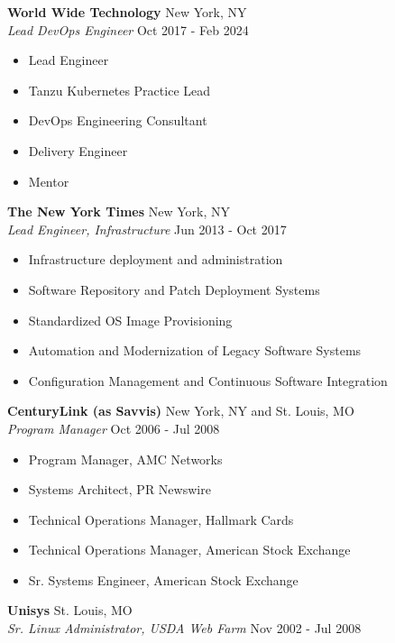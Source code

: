 \documentclass[letterpaper]{article}
\begin{document}
\textbf{World Wide Technology} \hfill New York, NY\\
\textit{Lead DevOps Engineer} \hfill Oct 2017 - Feb 2024\\
\vspace{-1mm}
\begin{itemize} \itemsep 1pt
	\item Lead Engineer
	\item Tanzu Kubernetes Practice Lead
	\item DevOps Engineering Consultant
	\item Delivery Engineer
	\item Mentor
\end{itemize}
\textbf{The New York Times} \hfill New York, NY\\
\textit{Lead Engineer, Infrastructure} \hfill Jun 2013 - Oct 2017\\
\vspace{-1mm}
\begin{itemize} \itemsep 1pt
	\item Infrastructure deployment and administration
	\item Software Repository and Patch Deployment Systems
	\item Standardized OS Image Provisioning
	\item Automation and Modernization of Legacy Software Systems
	\item Configuration Management and Continuous Software Integration
\end{itemize}
\textbf{CenturyLink (as Savvis)} \hfill New York, NY and St. Louis, MO\\
\textit{Program Manager} \hfill Oct 2006 - Jul 2008\\
\vspace{-1mm}
\begin{itemize} \itemsep 1pt
	\item Program Manager, AMC Networks
	\item Systems Architect, PR Newswire
	\item Technical Operations Manager, Hallmark Cards
	\item Technical Operations Manager, American Stock Exchange
	\item Sr. Systems Engineer, American Stock Exchange
\end{itemize}
\textbf{Unisys} \hfill St. Louis, MO\\
\textit{Sr. Linux Administrator, USDA Web Farm} \hfill Nov 2002 - Jul 2008\\
\vspace{-1mm}
\end{document}
